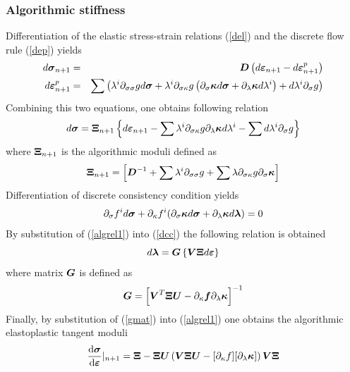 \documentclass[a4paper]{article}
\newcommand{\mbf}[1]{\mbox{\boldmath$#1$}}
\newcommand{\del}[2]{\mbox{$\displaystyle\frac{#1}{#2}$}}
\newcommand{\ep}[0]{\mbf{\varepsilon}^p}
\newcommand{\e}{\mbf{\varepsilon}}
\newcommand{\sig}{\mbf{\sigma}}
\newcommand{\kap}{\mbf{\kappa}}
\begin{document}
\subsubsection{Algorithmic stiffness}
Differentiation of the elastic stress-strain relations (\ref{del}) and the discrete flow rule (\ref{dep}) yields
\begin{eqnarray}
  d\sig_{n+1}&=&\mbf{D}\left(d\e_{n+1}-d\ep_{n+1}\right)\\
  d\ep_{n+1}&=&\sum\left(\lambda^i\partial_{\sigma\sigma}gd\sig + \lambda^i\partial_{\sigma\kappa}g\left(\partial_{\sigma}\kap d\sig+\partial_{\lambda}\kap d\lambda^i\right)+d\lambda^i\partial_{\sigma}g\right)
\end{eqnarray}
Combining this two equations, one obtains following relation
\begin{equation}
\label{algrel1}
  d\sig = \mbf{\Xi}_{n+1} \left\{d\e_{n+1}-\sum\lambda^i\partial_{\sigma\kappa}g\partial_{\lambda}\kap d\lambda^i - \sum d\lambda^i\partial_{\sigma}g\right\}
\end{equation}
where $\mbf{\Xi}_{n+1}$ is the algorithmic moduli defined as
\begin{equation}
  \mbf{\Xi}_{n+1}=\left[\mbf{D}^{-1}+\sum\lambda^i\partial_{\sigma\sigma}g+\sum\lambda\partial_{\sigma\kappa}g\partial_{\sigma}\kap\right]
\end{equation}
Differentiation of discrete consistency condition yields
\begin{equation}
  \label{dcc}
  \partial_\sigma f^i d\sig + \partial_\kappa f^i (\partial_\sigma \kap d\sig + \partial_\lambda \kap d\mbf{\lambda}) = 0
\end{equation}
By substitution of (\ref{algrel1}) into (\ref{dcc}) the following relation is obtained
\begin{equation}
  d\mbf{\lambda} = \mbf{G} \left\{\mbf{V}\mbf{\Xi}d\e\right\}
\end{equation}
where matrix $\mbf{G}$ is defined as
\begin{equation}
 \label{gmat}
  \mbf{G}=\left[\mbf{V}^T\mbf{\Xi}\mbf{U}-\partial_{\kappa}\mbf{f}\partial_{\lambda}\mbf{\kappa}\right]^{-1}
\end{equation}
Finally, by substitution of (\ref{gmat}) into (\ref{algrel1}) one obtains the algorithmic elastoplastic tangent moduli
\begin{equation}
  \del{\rm{d}\sig}{\rm{d}\e}\vert_{n+1}=\mbf{\Xi}-\mbf{\Xi}\mbf{U}\left(\mbf{V}\mbf{\Xi}\mbf{U}-[\partial_{\kappa}f][\partial_{\lambda}\kap]\right) \mbf{V}\mbf{\Xi}
\end{equation}
\end{document}
